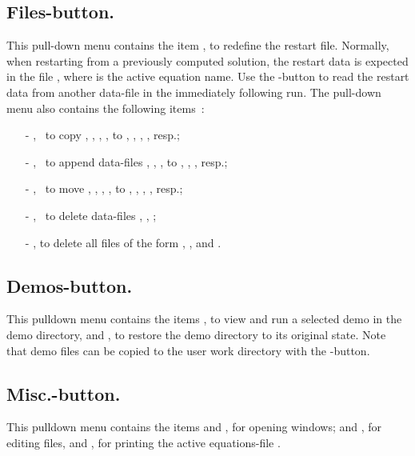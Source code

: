 \subsection{ Files-button.}
This pull-down menu contains 
the item 
, to redefine the restart file.
Normally, when restarting from a previously computed solution,
the restart data is expected in the file ,
where  is the active equation name.
Use the -button to read the restart data from another data-file
in the immediately following run.  
The pull-down menu also contains the following items~:
\begin{itemize}
\item[-],~ to copy  
  , , , ,
  to
  , , , , resp.;

\item[-],~ to append data-files
  , , ,
  to
  , , , resp.;

\item[-],~ to move 
  , , , ,
  to
  , , , , resp.;

\item[-],~ to delete data-files
  , , ;  

\item[-], to delete all files of the form 
  , , and .  
\end{itemize}


\subsection{ Demos-button.}
This pulldown menu contains the items
,
to view and run a selected \AUTO demo in the demo directory,
and
,
to restore the demo directory to its original state.
Note that demo files can be copied to the user work directory
with the -button.


\subsection{ Misc.-button.}
This pulldown menu contains the items
and
,
for opening windows;
and
,
for editing files,
and
, for printing the active equations-file .



